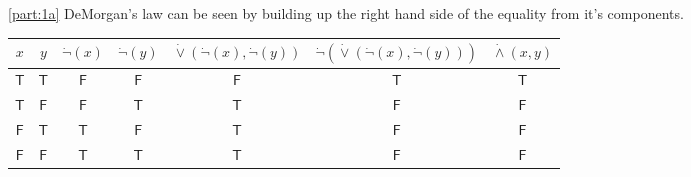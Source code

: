 \documentclass[boxes,pages,color=CornflowerBlue]{homework}
\newcommand{\true}{\ensuremath{\mathsf{T}}}
\newcommand{\false}{\ensuremath{\mathsf{F}}}
\begin{document}
\begin{solution}
    \ref{part:1a}
    DeMorgan's law can be seen by building up the right hand side of the equality from it's components.
    \begin{center}
        \begin{tabular}{ccccccc}
            $x$    & $y$    & $\dot{\neg}(x)$ & $\dot{\neg}(y)$ & $\dot{\vee}(\dot{\neg}(x), \dot{\neg}(y))$ & $\dot{\neg}(\dot{\vee}(\dot{\neg}(x), \dot{\neg}(y)))$ & $\dot{\wedge}(x, y)$ \\ \toprule
            \true  & \true  & \false          & \false          & \false                                     & \true                                                  & \true                \\
            \true  & \false & \false          & \true           & \true                                      & \false                                                 & \false               \\
            \false & \true  & \true           & \false          & \true                                      & \false                                                 & \false               \\
            \false & \false & \true           & \true           & \true                                      & \false                                                 & \false
        \end{tabular}
    \end{center}


\end{solution}
\end{document}
